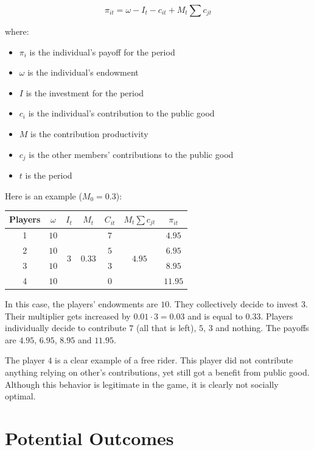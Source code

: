 		\[
			\pi_{it} = \omega - I_t - c_{it} + M_t \sum c_{jt}
		\]
		
		where:
			\begin{itemize}
				\item
					$\pi_{i}$ is the individual's payoff for the period
				\item
					$\omega$ is the individual's endowment
				\item
					$I$ is the investment for the period
				\item
					$c_i$ is the individual's contribution to the public good
				\item
					$M$ is the contribution productivity
				\item
					$c_j$ is the other members' contributions to the public good
				\item
					$t$ is the period
			\end{itemize}

		Here is an example ($M_0 = 0.3$):
		\begin{center}
			\begin{tabular}{ | c | c | c | c | c | c | c |}
				\hline
				Players	& $\omega$	& $I_t$						& $M_t$					& $C_{it}$	& $M_t \sum c_{jt}$			& $\pi_{it}$	\\ \hline
				1		& $10$	& \multirow{4}{*}{$3$}	& \multirow{4}{*}{0.33}	& $7$		& \multirow{4}{*}{$4.95$}	& $4.95$		\\ 
				2		& $10$	& 							&						& $5$		&							& $6.95$		\\ 
				3		& $10$	& 							&						& $3$		&							& $8.95$		\\ 
				4		& $10$	& 							&						& $0$		&							& $11.95$		\\ \hline
			\end{tabular}
		\end{center}
		
		In this case, the players' endowments are $10$. They collectively decide to invest $3$. Their multiplier gets increased by $0.01 \cdot 3 = 0.03$ and is equal to $0.33$. Players individually decide to contribute $7$ (all that is left), $5$, $3$ and nothing. The payoffs are $4.95$, $6.95$, $8.95$ and $11.95$.

		The player $4$ is a clear example of a free rider. This player did not contribute anything relying on other's contributions, yet still got a benefit from public good. Although this behavior is legitimate in the game, it is clearly not socially optimal.

\section{Potential Outcomes}

